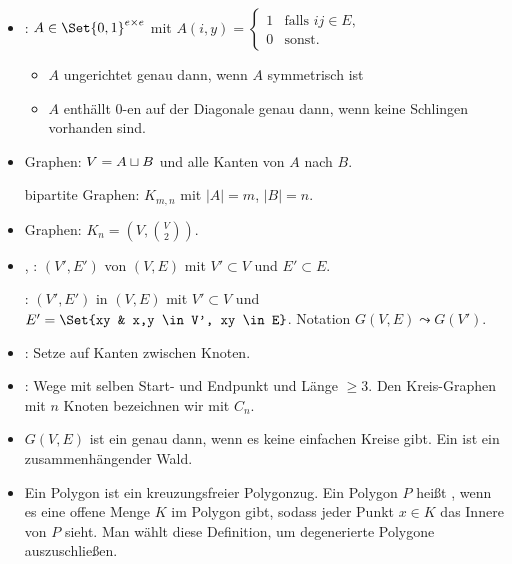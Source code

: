 \begin{df}
    \begin{itemize}
        \item
            : $A \in \Set{0,1}^{e \times e}$ mit
            \begin{math}
                A(i,y) = \begin{cases}
                    1 & \text{falls $ij \in E$}, \\
                    0 & \text{sonst}.
                \end{cases}
            \end{math}
            \begin{itemize}
                \item
                    $A$ ungerichtet genau dann, wenn $A$ symmetrisch ist
                \item
                    $A$ enthällt $0$-en auf der Diagonale genau dann, wenn keine Schlingen vorhanden sind.
            \end{itemize}
        \item
             Graphen: $V = A \sqcup B$ und alle Kanten von $A$ nach $B$.

             bipartite Graphen: $K_{m,n}$ mit $|A| = m$, $|B| = n$.
        \item
             Graphen: $K_n = (V, \binom{V}{2})$.
        \item
            , : $(V', E')$ von $(V, E)$ mit $V' \subset V$ und $E' \subset E$.

            : $(V', E')$ in $(V, E)$ mit $V' \subset V$ und $E' = \Set{xy & x,y \in V', xy \in E}$.
            Notation $G(V,E) \leadsto G(V')$.
        \item
            : Setze auf Kanten zwischen Knoten.
        \item
            : Wege mit selben Start- und Endpunkt und Länge $\ge 3$.
            Den Kreis-Graphen mit $n$ Knoten bezeichnen wir mit $C_n$.
        \item
            $G(V, E)$ ist ein  genau dann, wenn es keine einfachen Kreise gibt.
            Ein  ist ein zusammenhängender Wald.
        \item
            Ein Polygon ist ein kreuzungsfreier Polygonzug.
            Ein Polygon $P$ heißt , wenn es eine offene Menge $K$ im Polygon gibt, sodass jeder Punkt $x \in K$ das Innere von $P$ sieht.
            Man wählt diese Definition, um degenerierte Polygone auszuschließen.
    \end{itemize}
\end{df}


